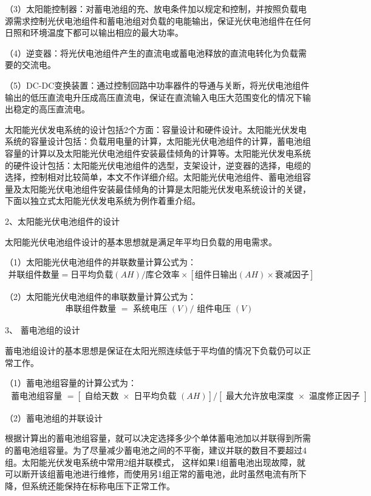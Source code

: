 （3）太阳能控制器：对蓄电池组的充、放电条件加以规定和控制，并按照负载电源需求控制光伏电池组件和蓄电池组对负载的电能输出，保证光伏电池组件在任何日照和环境温度下都可以输出相应的最大功率。

（4）逆变器：将光伏电池组件产生的直流电或蓄电池释放的直流电转化为负载需要的交流电。

（5）DC-DC变换装置：通过控制回路中功率器件的导通与关断，将光伏电池组件输出的低压直流电升压成高压直流电，保证在直流输入电压大范围变化的情况下输出稳定的高压直流电。

太阳能光伏发电系统的设计包括2个方面：容量设计和硬件设计。太阳能光伏发电系统的容量设计包括：负载用电量的计算，太阳能光伏电池组件的计算，蓄电池组容量的计算以及太阳能光伏电池组件安装最佳倾角的计算等。太阳能光伏发电系统的硬件设计包括：太阳能光伏电池组件的选型，支架设计，逆变器的选择，电缆的选择，控制相对比较简单，本文不作详细介绍。太阳能光伏电池组件、蓄电池组容量及太阳能光伏电池组件安装最佳倾角的计算是太阳能光伏发电系统设计的关键，下面以独立式太阳能光伏发电系统为例作着重介绍。

2、太阳能光伏电池组件的设计

太阳能光伏电池组件设计的基本思想就是满足年平均日负载的用电需求。

（1）太阳能光伏电池组件的并联数量计算公式为：
\begin{align}
  \text{并联组件数量} = \text{日平均负载}(AH) / \text{库仑效率}
  \times [\text{组件日输出} (AH) \times \text{衰减因子}]
\end{align}

（2）太阳能光伏电池组件的串联数量计算公式为：
\begin{align}
  \text{ 串联组件数量 }=\text{ 系统电压 }(V)/\text{ 组件电压 }(V)
\end{align}

3、 蓄电池组的设计

蓄电池组设计的基本思想是保证在太阳光照连续低于平均值的情况下负载仍可以正常工作。

（1）蓄电池组容量的计算公式为：
\begin{align}
  \text{ 蓄电池组容量 }=[\text{ 自给天数 }\times\text{ 日平均负载 }(AH)]/[\text{ 最大允许放电深度 }\times\text{ 温度修正因子 }]
\end{align}

（2）蓄电池组的并联设计

根据计算出的蓄电池组容量，就可以决定选择多少个单体蓄电池加以并联得到所需的蓄电池组容量。为了尽量减少蓄电池之间的不平衡，建议并联的数目不要超过4组。太阳能光伏发电系统中常用2组并联模式， 这样如果1组蓄电池出现故障，就可以断开该组蓄电池进行维修，而使用另1组正常的蓄电池，此时虽然电流有所下降，但系统还能保持在标称电压下正常工作。

